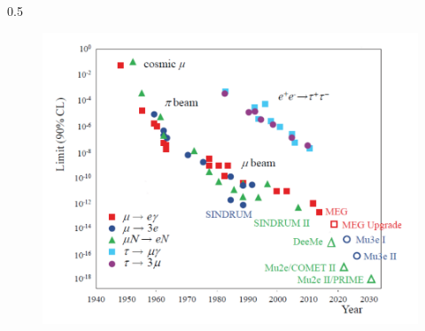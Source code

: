 \documentclass{beamer}
\begin{document}
\begin{frame}
\begin{columns}
\begin{column}{0.5\framewidth}
\begin{figure}[h]
            \centering
            \hspace*{-3.1ex}
            \includegraphics[width=1.1\columnwidth]{figures/png/Screenshot_20240912_093047.png}
        \end{figure}  
    \end{column}
\end{columns}
\end{frame}



\end{document}
